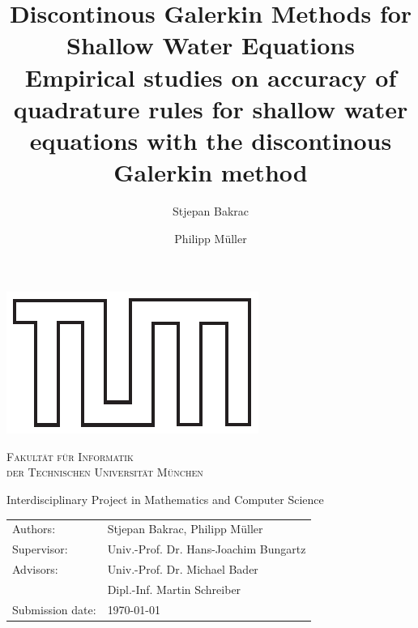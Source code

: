 \documentclass{article}
\title{Discontinous Galerkin Methods for Shallow Water Equations\\
  \vspace{.2cm}
\large{Empirical studies on accuracy of quadrature rules for shallow water equations with the discontinous Galerkin method}
}
\author{Stjepan Bakrac \and Philipp M\"uller}
\date{}
\begin{document}
\thispagestyle{empty}
\makeatletter
\begin{titlepage}
\vspace*{\fill}
\begin{center}
  \includegraphics[scale=0.75]{TUM.pdf}

  \vspace{.5cm}
  \textsc{ \Large Fakultät für Informatik\\\vspace{.2cm}
    \large der Technischen Universität München}

  \vspace{1cm}

  \large Interdisciplinary Project in Mathematics and Computer Science

  \vspace{.4cm}

  \LARGE
  \@title

  \vspace{1cm}
  \vfill{}
  \begin{tabular}{ll}
    Authors:         & Stjepan Bakrac, Philipp Müller \\
    Supervisor:      & Univ.-Prof. Dr. Hans-Joachim Bungartz \\
    Advisors:        & Univ.-Prof. Dr. Michael Bader \\
                     & Dipl.-Inf. Martin Schreiber \\
    Submission date: & \today
  \end{tabular}

  \vspace{1cm}

\end{center}
\vspace*{\fill}
\end{titlepage}
\makeatother
\end{document}
